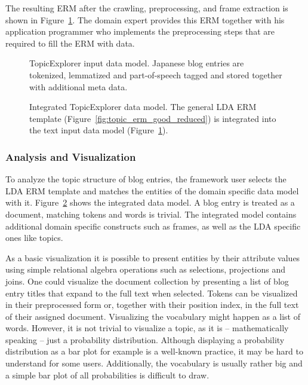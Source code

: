 The resulting ERM after the crawling, preprocessing, and frame extraction is shown in Figure~\ref{fig:TopicExplorer_data_erm}. The domain expert provides this ERM together with his application programmer who implements the preprocessing steps that are required to fill the ERM with data.

\begin{figure}[p]
\centering
\scalebox{\tikzScale}{\adjustTikzSize }
\caption[TopicExplorer input data model]{TopicExplorer input data model. Japanese blog entries are tokenized, lemmatized and part-of-speech tagged and stored together with additional meta data.}\label{fig:TopicExplorer_data_erm}
\end{figure}

\begin{figure}[p]
\centering
\scalebox{0.7}{\adjustTikzSize }
\caption[Integrated TopicExplorer data model]{Integrated TopicExplorer data model. The general LDA ERM template (Figure~\ref{fig:topic_erm_good_reduced}) is integrated into the text input data model (Figure~\ref{fig:TopicExplorer_data_erm}).}\label{fig:TopicExplorer_integrated_erm}
\end{figure}

\subsubsection{Analysis and Visualization}
\label{subsec:casestudy_analysis}

To analyze the topic structure of blog entries, the framework user selects the LDA ERM template and matches the entities of the domain specific data model with it. Figure~\ref{fig:TopicExplorer_integrated_erm} shows the integrated data model. A blog entry is treated as a document, matching tokens and words is trivial. The integrated model contains additional domain specific constructs such as frames, as well as the LDA specific ones like topics.

As a basic visualization it is possible to present entities by their attribute values using simple relational algebra operations such as selections, projections and joins. One could visualize the document collection by presenting a list of blog entry titles that expand to the full text when selected. Tokens can be visualized in their preprocessed form or, together with their position index, in the full text of their assigned document. Visualizing the vocabulary might happen as a list of words. However, it is not trivial to visualize a topic, as it is -- mathematically speaking -- just a probability distribution. Although displaying a probability distribution as a bar plot for example is a well-known practice, it may be hard to understand for some users. Additionally, the vocabulary is usually rather big and a simple bar plot of all probabilities is difficult to draw.

